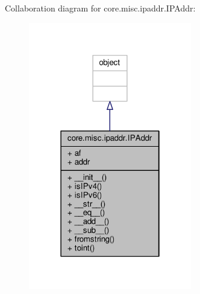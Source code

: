 Collaboration diagram for core.\+misc.\+ipaddr.\+I\+P\+Addr\+:
\nopagebreak
\begin{figure}[H]
\begin{center}
\leavevmode
\includegraphics[width=202pt]{classcore_1_1misc_1_1ipaddr_1_1_i_p_addr__coll__graph}
\end{center}
\end{figure}
